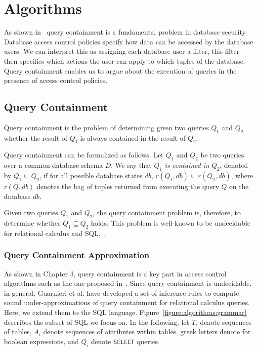 \section{Algorithms}

As shown in~\cite{guarnieri2014optimal} query containment is a fundamental problem in database security.
%
Database access control policies specify how data can be accessed by the database users.
%
We can interpret this as assigning each database user a filter, this filter then specifies which actions the user can apply to which tuples of the database.
%
Query containment enables us to argue about the execution of queries in the presence of access control policies.

\subsection{Query Containment}

Query containment is the problem of determining given two queries $Q_1$ and $Q_2$ whether the result of $Q_1$ is always contained in the result of $Q_2$. %

Query containment can be formalized as follows.
%
Let $Q_1$ and $Q_2$ be two queries over a common database schema $D$.
%
We say that \emph{$Q_1$ is contained in $Q_2$}, denoted by $Q_1 \subseteq Q_2$, if for all possible database states $\mathit{db}$, $r(Q_1,\mathit{db}) \subseteq r(Q_2, \mathit{db})$, where $r(Q, db)$ denotes the bag of tuples returned from executing the query $Q$ on the database $db$.


Given two queries $Q_1$ and $Q_2$, the query containment problem is, therefore, to determine whether $Q_1 \subseteq Q_2$ holds.
%
This problem is well-known to be undecidable for relational calculus and SQL.~\cite{abiteboul1995foundations}.

\subsubsection{Query Containment Approximation}

As shown in Chapter 3, query containment is a key part in access control algorithms such as the one proposed in~\cite{guarnieri2016strong}.
Since query containment is undecidable, in general, Guarnieri et al. have developed a set of inference rules to compute sound under-approximations of query containment for relational calculus queries.
%
Here, we extend them to the SQL language.
%
Figure~\ref{figure:algorithms:grammar} describes the subset of SQL we focus on. 
%
In the following, let $T_i$ denote sequences of tables, $A_i$ denote sequences of attributes within tables, greek letters denote for boolean expressions, and $Q_i$ denote \texttt{SELECT} queries.


